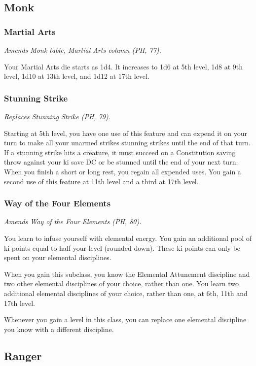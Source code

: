 \documentclass[letterpaper,twocolumn,openany,nodeprecatedcode]{dndbook}
\begin{document}
\subsection{Monk}

\subsubsection{Martial Arts}
\textit{Amends Monk table, Martial Arts column (PH, 77).}

Your Martial Arts die starts as 1d4. It increases to 1d6 at 5th level, 1d8 at 9th level, 1d10 at 13th level, and 1d12 at 17th level.

\subsubsection{Stunning Strike}
\textit{Replaces Stunning Strike (PH, 79).}

Starting at 5th level, you have one use of this feature and can expend it on your turn to make all your unarmed strikes stunning strikes until the end of that turn. If a stunning strike hits a creature, it must succeed on a Constitution saving throw against your ki save DC or be stunned until the end of your next turn. When you finish a short or long rest, you regain all expended uses. You gain a second use of this feature at 11th level and a third at 17th level. 

\subsubsection{Way of the Four Elements}
\textit{Amends Way of the Four Elements (PH, 80).}

You learn to infuse yourself with elemental energy. You gain an additional pool of ki points equal to half your level (rounded down). These ki points can only be spent on your elemental disciplines.

When you gain this subclass, you know the Elemental Attunement discipline and two other elemental disciplines of your choice, rather than one. You learn two additional elemental disciplines of your choice, rather than one, at 6th, 11th and 17th level.

Whenever you gain a level in this class, you can replace one elemental discipline you know with a different discipline.

\subsection{Ranger}
\end{document}
